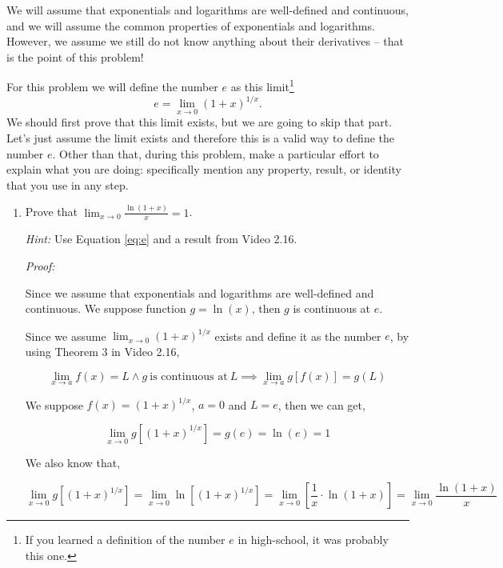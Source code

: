 \documentclass[12pt]{exam}
\newcommand {\DS} [1] {${\displaystyle #1}$}
\newcommand{\vv}{\vspace{.1cm}}
\begin{document}
\begin{enumerate}
We will assume that exponentials and logarithms are well-defined and continuous, and we will assume the common properties of exponentials and logarithms.   However, we assume we still do not know anything about their derivatives -- that is the point of this problem!

For this problem we will define the number $e$ as this limit\footnote{If you learned a definition of the number $e$ in high-school, it was probably this one.}
	\begin{equation}  \label{eq:e}
		e = \lim_{x \to 0} \left( 1 + x \right)^{1/x}.
	\end{equation}
We should first prove that this limit exists, but we are going to skip that part.  Let's just assume the limit exists and therefore this is a valid way to define the number $e$.
  Other than that, during this problem, make a particular effort to explain what you are doing: specifically mention any property, result, or identity that you use in any step.

	\begin{enumerate}
		\item  Prove that \DS{\lim_{x \to 0} \frac{\ln (1+x)}{x} = 1}.
		
			\emph{Hint:}  Use Equation \eqref{eq:e} and a result from Video 2.16.
		\vv
		
        \emph{Proof:}
        
        \vv
        
        Since we assume that exponentials and logarithms are well-defined and continuous. We suppose function $g=\ln(x)$, then $g$ is continuous at $e$.
        
        Since we assume $\lim_{x \to 0} \left( 1 + x \right)^{1/x}$ exists and define it as the number $e$, by using Theorem 3 in Video 2.16,
        
        $$
            \lim_{x \to a}f(x)=L \land {g\ \mbox{is continuous at}\ L} \implies \lim_{x \to a}g[f(x)]=g(L)
        $$
        
        We suppose $f(x)=\left( 1 + x \right)^{1/x}$, $a=0$ and $L=e$, then we can get,
        
        $$
            \lim_{x \to 0} g[\left( 1 + x \right)^{1/x}]=g(e)=\ln(e)=1
        $$
        
        We also know that,
        
        $$
            \lim_{x \to 0} g[\left( 1 + x \right)^{1/x}]=\lim_{x \to 0} \ln[\left( 1 + x \right)^{1/x}]=\lim_{x \to 0} [\frac{1}{x}\cdot\ln(1 + x)]=\lim_{x \to 0}\frac{\ln (1+x)}{x}
        $$
        

\end{enumerate}
\end{enumerate}
\end{document}
